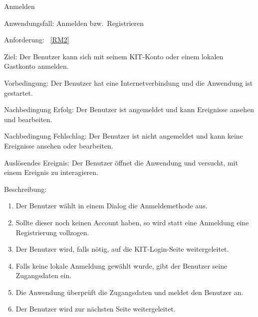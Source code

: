 
\begin{function}{20}{Anmelden}
    \item[Anwendungsfall:] Anmelden bzw.\ Registrieren
    \item[Anforderung:]~\ref{RM2}
    \item[Ziel:] Der Benutzer kann sich mit seinem KIT-Konto oder einem lokalen Gastkonto anmelden.
    \item[Vorbedingung:] Der Benutzer hat eine Internetverbindung und die Anwendung ist gestartet.
    \item[Nachbedingung Erfolg:] Der Benutzer ist angemeldet und kann Ereignisse ansehen und bearbeiten.
    \item[Nachbedingung Fehlschlag:] Der Benutzer ist nicht angemeldet und kann keine Ereignisse ansehen oder bearbeiten.
    \item[Auslösendes Ereignis:] Der Benutzer öffnet die Anwendung und versucht, mit einem Ereignis zu interagieren.
    \item[Beschreibung:] ~
    \begin{enumerate}
        \item Der Benutzer wählt in einem Dialog die Anmeldemethode aus.
        \item Sollte dieser noch keinen Account haben, so wird statt eine Anmeldung eine Registrierung vollzogen.
        \item Der Benutzer wird, falls nötig, auf die KIT-Login-Seite weitergeleitet.
        \item Falls keine lokale Anmeldung gewählt wurde, gibt der Benutzer seine Zugangsdaten ein.
        \item Die Anwendung überprüft die Zugangsdaten und meldet den Benutzer an.
        \item Der Benutzer wird zur nächsten Seite weitergeleitet.
    \end{enumerate}
\end{function}
